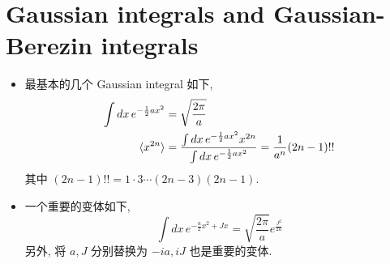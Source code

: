 \chapter{Gaussian integrals and Gaussian-Berezin integrals}
\begin{itemize}
	\item 最基本的几个 Gaussian integral 如下,
	\begin{align}
		\int dx \, e^{- \frac{1}{2} a x^2} &= \sqrt{\frac{2 \pi}{a}} \\
		\braket{x^{2 n}} &= \frac{\int dx \, e^{- \frac{1}{2} a x^2} x^{2 n}}{\int dx \, e^{- \frac{1}{2} a x^2}} = \frac{1}{a^n} (2 n - 1)!! \label{B.0.2}
	\end{align}
	其中 $(2 n - 1)!! = 1 \cdot 3 \cdots (2 n - 3) (2 n - 1)$.
	
	\item 一个重要的变体如下,
	\begin{equation}
		\int dx \, e^{- \frac{a}{2} x^2 + J x} = \sqrt{\frac{2 \pi}{a}} e^{\frac{J^2}{2 a}}
	\end{equation}
	另外, 将 $a, J$ 分别替换为 $- i a, i J$ 也是重要的变体.
\end{itemize}

